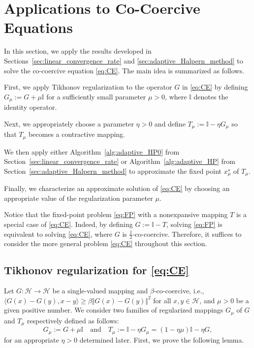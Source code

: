 \documentclass{article}
\theoremstyle{plain}
\theoremstyle{definition}
\newcommand{\Id}{\mathbb{I}}
\newcommand{\Hil}{\mathcal{H}}
\newcommand{\norms}[1]{\Vert#1\Vert}
\newcommand{\iprods}[1]{\langle #1\rangle}
\newcommand{\0}{\boldsymbol{0}}
\begin{document}
\section{Applications to Co-Coercive Equations}\label{sec:NonExMapping}
In this section, we apply the results developed in Sections~\ref{sec:linear_convergence_rate} and \ref{sec:adaptive_Halpern_method} to solve the co-coercive equation \eqref{eq:CE}. The main idea is summarized as follows.
\begin{compactitem}
\item First, we apply Tikhonov regularization to the operator $G$ in \eqref{eq:CE} by defining $G_{\mu} := G + \mu \Id$ for a sufficiently small parameter $\mu > 0$, where $\Id$ denotes the identity operator.

\item Next, we appropriately choose a parameter $\eta > 0$ and define $T_{\mu} := \Id - \eta G_{\mu}$ so that $T_{\mu}$ becomes a contractive mapping.

\item We then apply either Algorithm~\ref{alg:adaptive_HP0} from Section~\ref{sec:linear_convergence_rate} or Algorithm~\ref{alg:adaptive_HP} from Section~\ref{sec:adaptive_Halpern_method} to approximate the fixed point $x^{\star}_{\mu}$ of $T_{\mu}$.

\item Finally, we characterize an approximate solution of \eqref{eq:CE} by choosing an appropriate value of the regularization parameter $\mu$.
\end{compactitem}
Notice that the fixed-point problem \eqref{eq:FP} with a nonexpansive mapping $T$ is a special case of \eqref{eq:CE}. 
Indeed, by defining $G := \Id - T$, solving \eqref{eq:FP} is equivalent to solving \eqref{eq:CE}, where $G$ is $\frac{1}{2}$-co-coercive. 
Therefore, it suffices to consider the more general problem \eqref{eq:CE} throughout this section.

\subsection{Tikhonov regularization for \eqref{eq:CE}}\label{subsec:Tikhonov_reg}
Let $G : \Hil \to \Hil$ be a single-valued mapping and $\beta$-co-coercive, i.e., $\iprods{G(x) - G(y), x - y} \geq \beta\norms{G(x) - G(y)}^2$ for all $x, y \in \Hil$, and $\mu > 0$ be a given positive number.
We consider two families of regularized mappings $G_{\mu}$ of $G$ and $T_{\mu}$ respectively defined as follows:
\begin{equation}\label{eq:T_mu}
G_{\mu} := G + \mu \Id 
\quad \text{and} \quad T_{\mu} := \Id - \eta G_{\mu} = (1-\eta\mu)\Id - \eta G,
\end{equation}
for an appropriate $\eta > 0$ determined later.
First, we prove the following lemma.
\end{document}

